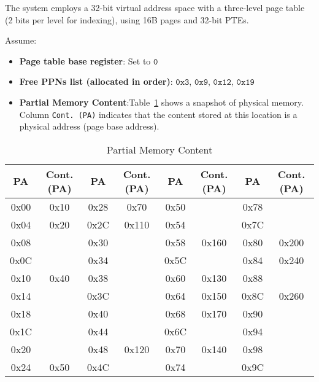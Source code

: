 

The system employs a 32-bit virtual address space with a three-level page table (2 bits per level for indexing), using 16B pages and 32-bit PTEs.

Assume:
\begin{itemize}[leftmargin=*]
    \item \textbf{Page table base register}: Set to  $\mathtt{0}$
    \item \textbf{Free PPNs list (allocated in order)}:  $\mathtt{0x3}$,  $\mathtt{0x9}$,  $\mathtt{0x12}$,  $\mathtt{0x19}$
    \item  \textbf{Partial Memory Content}:Table~\ref{tab:Memory} shows a snapshot of physical memory. Column \texttt{Cont. (PA)} indicates that the content stored at this location is a physical address (page base address).  
\end{itemize}


\begin{table}[ht]
\begin{minipage}{\textwidth} 
    \centering
    \caption{Partial Memory Content}
    \label{tab:Memory}
    \setlength{\tabcolsep}{10pt}
    \renewcommand{\arraystretch}{1.3} 
    \begin{tabular}{|c|c||c|c||c|c||c|c|}
        \hline
        \textbf{PA} & \textbf{Cont. (PA)} & \textbf{PA} & \textbf{Cont. (PA)} &\textbf{PA} & \textbf{Cont. (PA)} & \textbf{PA} & \textbf{Cont. (PA)} \\
        \hline
        0x00 & 0x10 & 0x28 & 0x70  & 0x50 &  & 0x78 &  \\
        \hline
        0x04 & 0x20 & 0x2C & 0x110 & 0x54 &  & 0x7C &  \\
        \hline
        0x08 &  & 0x30 &  & 0x58 & 0x160 & 0x80 & 0x200 \\
        \hline
        0x0C &  & 0x34 &  & 0x5C &  & 0x84 & 0x240 \\
        \hline
        0x10 & 0x40 & 0x38 &  & 0x60 & 0x130 & 0x88 &  \\
        \hline
        0x14 &  & 0x3C &  & 0x64 & 0x150  & 0x8C & 0x260 \\
        \hline
        0x18 &  & 0x40 &  & 0x68 & 0x170 & 0x90 &  \\
        \hline
        0x1C &  & 0x44 &  & 0x6C &  & 0x94 &  \\
        \hline
        0x20 &  & 0x48 & 0x120 & 0x70 & 0x140 & 0x98 &  \\
        \hline
        0x24 & 0x50 & 0x4C &  & 0x74 &  & 0x9C  &  \\
        \hline
    \end{tabular}
\end{minipage}
\end{table}

